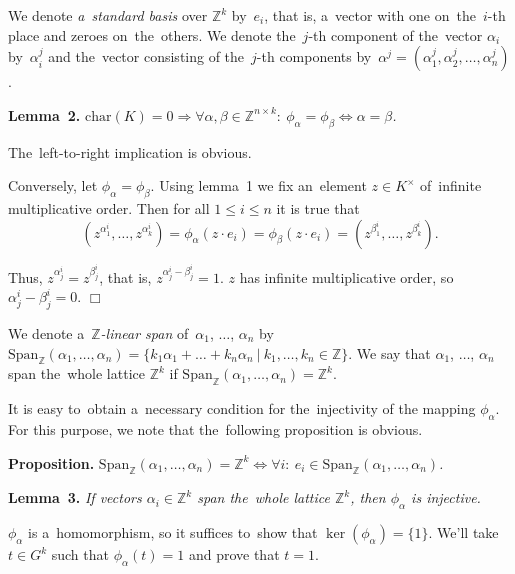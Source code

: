 \documentclass[twoside]{article}
\begin{document}
We denote \textit{a~standard basis} over $\mathbb{Z}^k$ by~$e_i$, that is, a~vector with one on~the~$i$-th place
and zeroes on~the~others. We denote the~$j$-th component of the~vector $\alpha_i$ by~$\alpha_i^j$
and the~vector consisting of the~$j$-th components by~$\alpha^j = (\alpha_1^j, \alpha_2^j, \ldots, \alpha_n^j)$.

\medskip\noindent\textbf{Lemma~2.}\emph{
    $
        \mathrm{char}(K) = 0 \Rightarrow \forall \alpha, \beta \in \mathbb{Z}^{n \times k}{:} \ \phi_\alpha = \phi_\beta \Leftrightarrow \alpha = \beta
    $.
}\medskip

    The~left-to-right implication is obvious.

    Conversely, let $\phi_\alpha = \phi_\beta$. Using lemma~1 we fix an~element $z \in K^\times$
    of~infinite multiplicative order. Then for all $1 \leq i \leq n$ it is true that
    $$
        (z^{\alpha_1^i}, \ldots, z^{\alpha_k^i}) = \phi_\alpha(z \cdot e_i) = \phi_\beta(z \cdot e_i) = (z^{\beta_1^i}, \ldots, z^{\beta_k^i}).
    $$

    Thus, $z^{\alpha_j^i} = z^{\beta_j^i}$, that is, $z^{\alpha_j^i - \beta_j^i} = 1$.
    $z$ has infinite multiplicative order, so $\alpha_j^i - \beta_j^i = 0$.
\hfill$\Box$\medskip

We denote a~\textit{$\mathbb{Z}$-linear span} of~$\alpha_1$, $\ldots$, $\alpha_n$
by~$\mathrm{Span}_\mathbb{Z}(\alpha_1, \ldots, \alpha_n) = \{ k_1 \alpha_1 + \ldots + k_n \alpha_n \ | \ k_1,\allowbreak \ldots,\allowbreak k_n \in \mathbb{Z} \}$.
We say that $\alpha_1$, $\ldots$, $\alpha_n$ span the~whole lattice $\mathbb{Z}^k$ if
$\mathrm{Span}_\mathbb{Z}(\alpha_1, \ldots, \alpha_n) = \mathbb{Z}^k$.

It is easy to~obtain a~necessary condition for the~injectivity of the mapping $\phi_\alpha$. For this purpose,
we note that the~following proposition is obvious.

\medskip\noindent\textbf{Proposition.}\emph{
    $\mathrm{Span}_\mathbb{Z}(\alpha_1, \ldots, \alpha_n) = \mathbb{Z}^k \Leftrightarrow \forall i{:}\ e_i \in \mathrm{Span}_\mathbb{Z}(\alpha_1, \ldots, \alpha_n)$.
}

\medskip\noindent\textbf{Lemma~3.}\emph{
    If vectors $\alpha_i \in \mathbb{Z}^k$ span the~whole lattice $\mathbb{Z}^k$, then $\phi_\alpha$ is injective.
}\medskip

    $\phi_\alpha$ is a~homomorphism, so it suffices to~show that $\ker(\phi_\alpha) = \{1\}$.
    We'll take $t \in G^k$ such that $\phi_\alpha(t) = 1$ and prove that $t = 1$.
\end{document}
